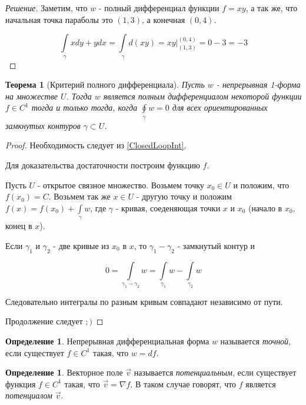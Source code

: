 \documentclass[a5paper]{article}
\newcounter{through}
\theoremstyle{plain}
\newtheorem{theorem}[through]{Теорема}
\theoremstyle{definition}
\newtheorem{definition}[through]{Определение}
\numberwithin{through}{section}
\numberwithin{equation}{section}
\begin{document}
\begin{proof}[Решение]
	Заметим, что $w$ - полный дифференциал функции $f=xy$, а так же, что начальная точка параболы это $(1, 3)$, а конечная $(0, 4)$.
	
	\begin{equation*}
		\int\limits_{\gamma} xdy + ydx = \int\limits_{\gamma} d(xy) = xy \bigg|_{(1, 3)}^{(0, 4)} = 0 - 3 = -3
	\end{equation*}
\end{proof}

\begin{theorem}[Критерий полного дифференциала]
	Пусть $w$ - непрерывная 1-форма на множестве $U$. Тогда $w$ является полным дифференциалом некоторой функции $f \in C^1$ тогда и только тогда, когда $\oint\limits_{\gamma} w = 0$ для всех ориентированных замкнутых контуров $\gamma \subset U$.
\end{theorem}

\begin{proof}
	Необходимость следует из \ref{ClosedLoopInt}.
	
	Для доказательства достаточности построим функцию $f$. 
	
	Пусть $U$ - открытое связное множество. Возьмем точку $x_0 \in U$ и положим, что $f(x_0)=C$. Возьмем так же $x \in U$ - другую точку и положим $f(x)=f(x_0)+\int\limits_{\gamma} w$, где $\gamma$ - кривая, соеденяющая точки $x$ и $x_0$ (начало в $x_0$, конец в $x$). 
	
	Если $\gamma_1$ и $\gamma_2$ - две кривые из $x_0$ в $x$, то $\gamma_1 - \gamma_2$ - замкнутый контур и 
	
	\begin{equation*}
		0 = \int\limits_{\gamma_1 - \gamma_2}w = \int\limits_{\gamma_1} w - \int\limits_{\gamma_2} w
	\end{equation*}
	
	Следовательно интегралы по разным кривым совпадают независимо от пути.
	
	Продолжение следует $;)$
\end{proof}


\begin{definition}
	Непрерывная дифференциальная форма $w$ называется \textit{точной}, если существует
	$f \in C^1$ такая, что $ w = df$.
\end{definition}

\begin{definition}
	Векторное поле $\vec{v}$ называется \textit{потенциальным}, если существует функция $f \in C^1$ 
	такая, что $\vec{v} = \nabla f$. В таком случае говорят, что $f$ является \textit{потенциалом}
	$\vec{v}$.
\end{definition}
\end{document}
